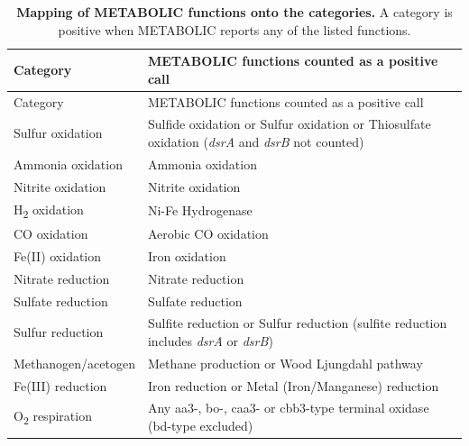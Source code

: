 \documentclass[10pt,a4paper,onecolumn]{article}
\begin{document}
{\begin{longtable}[]{@{}
  >{\raggedright\arraybackslash}p{}
  >{\raggedright\arraybackslash}p{}@{}}
\caption{\textbf{Mapping of METABOLIC functions onto the categories.} A
category is positive when METABOLIC reports any of the listed functions.
\label{tab:s_mapping}}\tabularnewline
\toprule\noalign{}
\begin{minipage}[b]{\linewidth}\raggedright
Category
\end{minipage} & \begin{minipage}[b]{\linewidth}\raggedright
METABOLIC functions counted as a positive call
\end{minipage} \\
\midrule\noalign{}
\endfirsthead
\toprule\noalign{}
\begin{minipage}[b]{\linewidth}\raggedright
Category
\end{minipage} & \begin{minipage}[b]{\linewidth}\raggedright
METABOLIC functions counted as a positive call
\end{minipage} \\
\midrule\noalign{}
\endhead
\bottomrule\noalign{}
\endlastfoot
Sulfur oxidation & Sulfide oxidation or Sulfur oxidation or Thiosulfate
oxidation (\emph{dsrA} and \emph{dsrB} not counted) \\
Ammonia oxidation & Ammonia oxidation \\
Nitrite oxidation & Nitrite oxidation \\
H\textsubscript{2} oxidation & Ni-Fe Hydrogenase \\
CO oxidation & Aerobic CO oxidation \\
Fe(II) oxidation & Iron oxidation \\
Nitrate reduction & Nitrate reduction \\
Sulfate reduction & Sulfate reduction \\
Sulfur reduction & Sulfite reduction or Sulfur reduction (sulfite
reduction includes \emph{dsrA} or \emph{dsrB}) \\
Methanogen/acetogen & Methane production or Wood Ljungdahl pathway \\
Fe(III) reduction & Iron reduction or Metal (Iron/Manganese)
reduction \\
O\textsubscript{2} respiration & Any aa3-, bo-, caa3- or cbb3-type
terminal oxidase (bd-type excluded) \\
\end{longtable}

}
\end{document}
